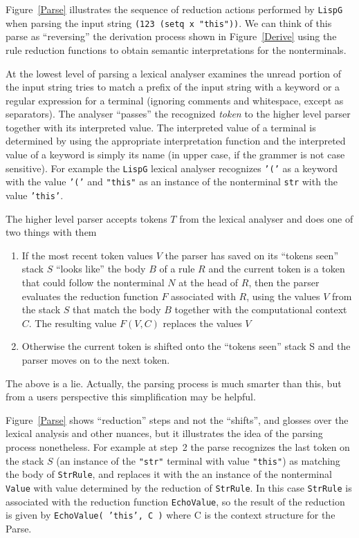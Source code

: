 Figure~\ref{Parse} illustrates the sequence of reduction actions
performed by {\tt LispG} when parsing the input string
{\tt (123 (setq x "this"))}.  We can think of this parse as
``reversing'' the derivation process shown in Figure~\ref{Derive}
using the rule reduction functions to obtain semantic
interpretations for the nonterminals.

At the lowest level of parsing a lexical analyser
examines the unread portion of the input string tries
to match a prefix of the input string with a keyword
or a regular expression for a terminal (ignoring comments
and whitespace, except as separators).  The analyser ``passes''
the recognized
{\em token} to the higher level parser
together with its interpreted value.  The interpreted
value of a terminal is determined by using the appropriate
interpretation function and the interpreted value of 
a keyword is simply its name (in upper case, if the
grammer is not case sensitive).  For example the {\tt LispG}
lexical analyser recognizes {\tt '('} as a keyword with the
value {\tt '('} and {\tt "this"} as an instance of the nonterminal
{\tt str} with the value {\tt 'this'}.

The higher level parser accepts tokens $T$ from the lexical analyser
and does one of two things with them
\begin{enumerate}
\item
If the most recent
token values $V$ the parser has saved on its ``tokens seen'' stack $S$
``looks like'' the body $B$ of a
 rule $R$ and the current token is a token that
could follow the nonterminal $N$ at the head of $R$, then
the parser evaluates the reduction function $F$ associated
with $R$, using the values $V$ from the stack $S$ that match the body
$B$ together with the computational context $C$.  The resulting
value $F(V,C)$ replaces the values $V$
\item
Otherwise the current token is shifted onto the ``tokens seen''
stack S and the parser moves on to the next token.
\end{enumerate}
The above is a lie.
Actually, the parsing process is much smarter than this, but
from a users perspective this simplification may be 
helpful.

Figure~\ref{Parse} shows ``reduction'' steps and not
the ``shifts'', and glosses over the lexical analysis and
other nuances,
but it illustrates the idea of the parsing process nonetheless.
For example at step~2 the parse recognizes the last token
on the stack $S$
(an instance of the {\tt "str"} terminal with value {\tt "this"})
as matching the body of {\tt StrRule}, and replaces it
with the an instance of the nonterminal {\tt Value}
with value determined by the reduction of {\tt StrRule}.
In this case {\tt StrRule} is associated with the reduction
function {\tt EchoValue}, so the result of the reduction
is given by {\tt EchoValue( 'this', C )} where C is the
context structure for the Parse.

